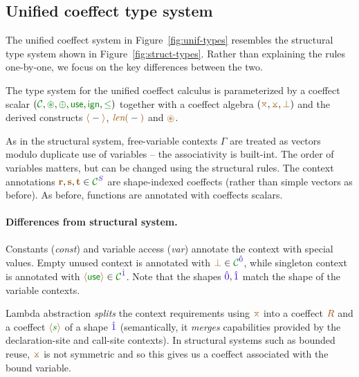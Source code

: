 \subsection{Unified coeffect type system}

The unified coeffect system in Figure~\ref{fig:unif-types} resembles the structural type system
shown in Figure~\ref{fig:struct-types}. Rather than explaining the rules one-by-one, we focus on
the key differences between the two.

The type system for the unified coeffect calculus is parameterized by a coeffect scalar 
$(\C, \cseq, \cpar, \cunit, \czero, \cleq)$ together with a coeffect algebra $(\azip, \apar, \azero)$ 
and the derived constructs $\alift{-}$, $\alen{-}$ and $\aseq$. 

As in the structural system, free-variable contexts $\Gamma$ are treated as vectors modulo duplicate
use of variables -- the associativity is built-int. The order of variables matters, but can be changed 
using the structural rules. The context annotations $\aclrd{\textbf{r}}, \aclrd{\textbf{s}}, \aclrd{\textbf{t}} \in \C^\SH$ 
are shape-indexed coeffects (rather than simple vectors as before). As before, functions are
annotated with coeffects scalars. %

\paragraph{Differences from structural system.} 





Constants (\emph{const}) and variable access (\emph{var}) annotate the context with special
values. Empty unused context is annotated with $\azero
\in \C^\sempty$, while singleton context 
is annotated with $\aunit \in \C^\sunit$.  Note that the shapes
$\sempty, \sunit$ match the shape of the variable contexts.

Lambda abstraction \emph{splits} the context requirements using $\azip$ into a coeffect 
$\aclrd{R}$ and a coeffect $\alift{\cclrd{s}}$ of a shape $\sunit$ (semantically, it \emph{merges}
capabilities provided by the declaration-site and call-site contexts). In structural systems such
as bounded reuse, $\apar$ is not symmetric and so this gives us a coeffect associated with the bound variable.

